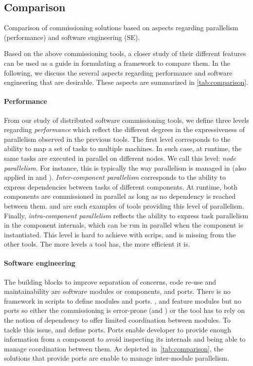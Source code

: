 \subsection{Comparison}

\begin{table}[tp]
  \centering
  \small
  
  \caption{Comparison of commissioning solutions based on aspects
  regarding parallelism (performance) and software engineering (SE).}
  \label{tab:comparison}
\end{table}

Based on the above commissioning tools, a closer study of their different
features can be used as a guide in formulating a framework to compare them. In
the following, we discuss the several aspects regarding performance and software
engineering that are desirable. These aspects are summarized in
\cref{tab:comparison}.

\paragraph{Performance}
From our study of distributed software commissioning tools, we define three
levels regarding \emph{performance} which reflect the different degrees in
the expressiveness of parallelism observed in the previous tools.
The first level corresponds to the ability to map a set of tasks to multiple
machines. In such case, at runtime, the same tasks are executed in parallel on
different nodes. We call this level: \emph{node parallelism}. For instance, this
is typically the way parallelism is managed in \ansible (also applied in
\deployware and \kubernetes).
\emph{Inter-component parallelism} corresponds to the ability to express
dependencies between tasks of different components. At runtime, both components
are commissioned in parallel as long as no dependency is reached between them.
\aeolus and \juju are such examples of tools providing this level of
parallelism. Finally, \emph{intra-component parallelism} reflects the ability to
express task parallelism in the component internals, which can be run in
parallel when the component is instantiated. This level is hard to achieve with
\shell scrips, and is missing from the other tools.
The more levels a tool has, the more efficient it is.

\paragraph{Software engineering}
The building blocks to improve separation of concerns, code re-use and
maintainability are software modules or components, and ports.
There is no framework in \shell scripts to define modules and ports. \ansible,
\deployware and \kubernetes feature modules but no ports so either the
commissioning is error-prone (\ie \ansible and \kubernetes) or the tool has to
rely on the notion of dependency to offer limited coordination between modules.
To tackle this issue, \juju and \aeolus define ports. Ports enable developer to
provide enough information from a component to avoid inspecting its internals
and being able to manage coordination between them. As depicted
in~\cref{tab:comparison}, the solutions that provide ports are enable to manage
inter-module parallelism.


